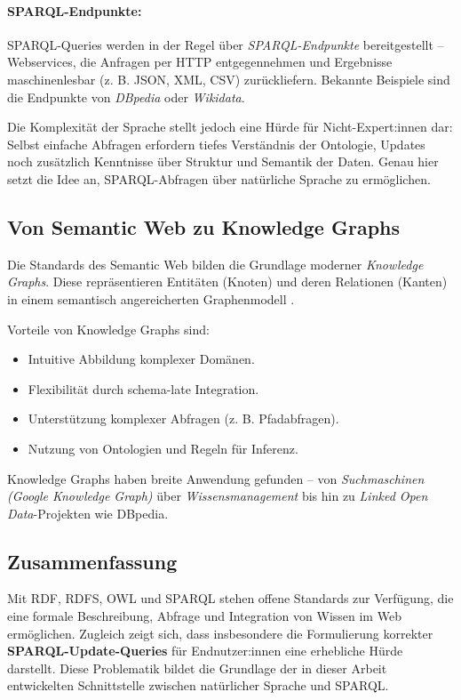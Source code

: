 \paragraph{SPARQL-Endpunkte:}  
SPARQL-Queries werden in der Regel über \textit{SPARQL-Endpunkte} bereitgestellt – Webservices, die Anfragen per HTTP entgegennehmen und Ergebnisse maschinenlesbar (z. B. JSON, XML, CSV) zurückliefern. Bekannte Beispiele sind die Endpunkte von \textit{DBpedia} oder \textit{Wikidata}.  

Die Komplexität der Sprache stellt jedoch eine Hürde für Nicht-Expert:innen dar: Selbst einfache Abfragen erfordern tiefes Verständnis der Ontologie, Updates noch zusätzlich Kenntnisse über Struktur und Semantik der Daten. Genau hier setzt die Idee an, SPARQL-Abfragen über natürliche Sprache zu ermöglichen.  

\subsection{Von Semantic Web zu Knowledge Graphs}

Die Standards des Semantic Web bilden die Grundlage moderner \textit{Knowledge Graphs}. Diese repräsentieren Entitäten (Knoten) und deren Relationen (Kanten) in einem semantisch angereicherten Graphenmodell \cite{hogan2021knowledge}.  

Vorteile von Knowledge Graphs sind:  
\begin{itemize}
    \item Intuitive Abbildung komplexer Domänen.  
    \item Flexibilität durch schema-late Integration.  
    \item Unterstützung komplexer Abfragen (z. B. Pfadabfragen).  
    \item Nutzung von Ontologien und Regeln für Inferenz.  
\end{itemize}

Knowledge Graphs haben breite Anwendung gefunden – von \textit{Suchmaschinen (Google Knowledge Graph)} über \textit{Wissensmanagement} bis hin zu \textit{Linked Open Data}-Projekten wie DBpedia.  

\subsection*{Zusammenfassung}

Mit RDF, RDFS, OWL und SPARQL stehen offene Standards zur Verfügung, die eine formale Beschreibung, Abfrage und Integration von Wissen im Web ermöglichen. Zugleich zeigt sich, dass insbesondere die Formulierung korrekter \textbf{SPARQL-Update-Queries} für Endnutzer:innen eine erhebliche Hürde darstellt. Diese Problematik bildet die Grundlage der in dieser Arbeit entwickelten Schnittstelle zwischen natürlicher Sprache und SPARQL.  





